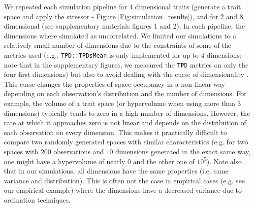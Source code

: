 \documentclass[12pt,letterpaper]{article}
\begin{document}
We repeated each simulation pipeline for 4 dimensional traits (generate a trait space and apply the stressor - Figure \ref{Fig:simulation_results}), and for 2 and 8 dimensional (see supplementary materials figures 1 and 2).
In each pipeline, the dimensions where simulated as uncorrelated.
We limited our simulations to a relatively small number of dimensions due to the constraints of some of the metrics used (e.g., \texttt{TPD::TPDsMean} is only implemented for up to 4 dimensions; \citealt{carmona2019trait} - note that in the supplementary figures, we measured the \texttt{TPD} metrics on only the four first dimensions) but also to avoid dealing with the curse of dimensionality \citep{bellman1957dynamic}.
This curse changes the properties of space occupancy in a non-linear way depending on each observation's distribution and the number of dimensions.
For example, the volume of a trait space (or hypervolume when using more than 3 dimensions) typically tends to zero in a high number of dimensions.
However, the rate at which it approaches zero is not linear and depends on the distribution of each observation on every dimension.
This makes it practically difficult to compare two randomly generated spaces with similar characteristics (e.g. for two spaces with $200$ observations and $10$ dimensions generated in the exact same way, one might have a hypervolume of nearly $0$ and the other one of $10^5$).
Note also that in our simulations, all dimensions have the same properties (i.e. same variance and distribution).
This is often not the case in empirical cases (e.g. see our empirical example) where the dimensions have a decreased variance due to ordination techniques.
 
\end{document}
